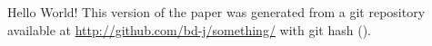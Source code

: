 \documentclass[12pt, preprint]{aastex}
\begin{document}
Hello World!
This version of the paper was generated
  from a git repository available at \url{http://github.com/bd-j/something/}
  with git hash \texttt{\githash} (\gitdate).
\end{document}
